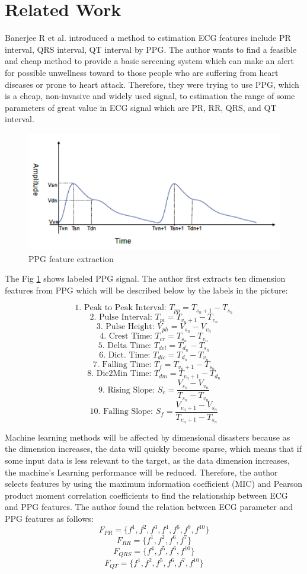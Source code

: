 \documentclass[a4paper,12pt]{article}
\begin{document}
\section{Related Work}
Banerjee R et al. introduced a method to estimation ECG features include PR interval, QRS interval, QT interval by PPG\parencite{Banerjee:2013estimation}. The author wants to find a feasible and cheap method to provide a basic screening system which can make an alert for possible unwellness toward to those people who are suffering from heart diseases or prone to heart attack. Therefore, they were trying to use PPG, which is a cheap, non-invasive and widely used signal, to estimation the range of some parameters of great value in ECG signal which are PR, RR, QRS, and QT interval. 

\begin{figure}[H]
\centering
\includegraphics[width = .8\textwidth]{ppg1.PNG}
\caption{PPG feature extraction\autocite{Banerjee:2013estimation}}
\label{fig:ppg1}
\end{figure}

The Fig \ref{fig:ppg1} shows labeled PPG signal. The author first extracts ten dimension features from PPG which will be described below by the labels in the picture:

\[\textrm{1. Peak to Peak Interval: }T_{pp} = T_{{s_n}+1} - T_{s_n}\]
\[\textrm{2. Pulse Interval: }T_{pi} = T_{{v_n}+1} - T_{v_n}\]
\[\textrm{3. Pulse Height: }V_{ph} = V_{s_n} - V_{v_n}\]
\[\textrm{4. Crest Time: }T_{cr} = T_{s_n} - T_{v_n}\]
\[\textrm{5. Delta Time: }T_{del} = T_{d_n} - T_{s_n}\]
\[\textrm{6. Dict. Time: }T_{dic} = T_{d_n} - T_{v_n}\]
\[\textrm{7. Falling Time: }T_{f} = T_{{v_n}+1} - T_{s_n}\]
\[\textrm{8. Dic2Min Time: }T_{dm} = T_{{v_n}+1} - T_{d_n}\]
\[\textrm{9. Rising Slope: }S_{r} = \frac{V_{s_n} - V_{v_n}}{T_{s_n} - T_{v_n}}\]
\[\textrm{10. Falling Slope: }S_{f} = \frac{V_{{v_n} + 1} - V_{s_n}}{T_{{v_n} + 1} - T_{s_n}}\]

Machine learning methods will be affected by dimensional disasters because as the dimension increases, the data will quickly become sparse, which means that if some input data is less relevant to the target, as the data dimension increases, the machine's Learning performance will be reduced. Therefore, the author selects features by using the maximum information coefficient (MIC) and Pearson product moment correlation coefficients to find the relationship between ECG and PPG features. The author found the relation between ECG parameter and PPG features as follows:
\[F_{PR} = \{f^1, f^2, f^3, f^4, f^6, f^9, f^{10}\}\]
\[F_{RR} = \{f^1, f^2, f^6, f^7\}\]
\[F_{QRS} = \{f^4, f^5, f^6, f^{10}\}\]
\[F_{QT} = \{f^1, f^2, f^5, f^6, f^7, f^{10}\}\]
\end{document}
